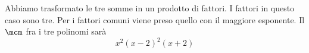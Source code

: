 \begin{esempio}
\begin{center}
\end{center}
Abbiamo trasformato le tre somme in un prodotto di fattori. I fattori in questo caso sono tre. Per i fattori comuni viene preso quello con il maggiore esponente. Il $\mcm$ fra i tre polinomi sarà\[x^2(x-2)^2(x+2) \]
\end{esempio}
